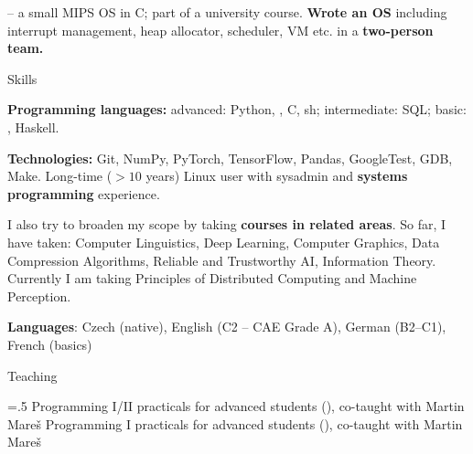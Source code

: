  – a small MIPS OS in C; part of a university course.
%
\: {\bf Wrote an OS} including interrupt management, heap allocator,
scheduler, VM etc. in a {\bf two-person team.}
\endlist


%
%


\vfill\eject

\sekce Skills
 
{\bf Programming languages:} {\af advanced:} {\B Python}, {\B \Cpp}, {\B C}, {\B sh}; {\af intermediate:} {\B SQL}; {\af basic:} \Cis{}, Haskell.

\smallskip

{\bf Technologies:} {\af Git}, {\af NumPy}, {\af PyTorch}, {\af TensorFlow},
{\af Pandas}, {\af GoogleTest}, {\af GDB}, {\af Make}. Long-time ($> 10$ years) Linux user
with sysadmin and {\bf systems programming} experience.

\smallskip

I also try to broaden my scope by taking {\bf courses in related areas}. So
far, I have taken: Computer Linguistics, Deep Learning, Computer Graphics, Data
Compression Algorithms, Reliable and Trustworthy AI, Information Theory.
Currently I am taking Principles of Distributed Computing and Machine
Perception.

\smallskip

{\bf Languages}: Czech (native), English (C2 -- CAE Grade A), German (B2–C1), French (basics)


\iffalse
\sekce Teaching

\itemindent=.5\itemindent
\itemnarrow=0pt
\list{-}
	\: Programming I/II practicals for advanced students (), co-taught with Martin Mareš
	\: Programming I practicals for advanced students (), co-taught with Martin Mareš
\endlist

